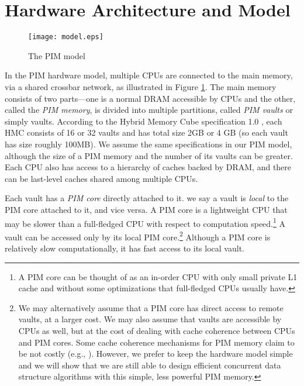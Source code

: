 \section{Hardware Architecture and Model}


\label{section:hardware_model}

\begin{figure}[ht!]
\centering
\texttt{[image: model.eps]}
\caption{The PIM model}
\label{figure:model}
\end{figure}

In the PIM hardware model, multiple CPUs are connected to the main
memory, via a shared crossbar network, as illustrated in Figure \ref{figure:model}.
The main memory consists of two parts---one is a normal DRAM accessible by CPUs 
and the other, called the \textit{PIM memory}, is divided into multiple partitions, 
called \textit{PIM vaults} or simply vaults.  
According to the Hybrid Memory Cube specification 1.0 \cite{website:HMC}, each HMC consists of 16 or 
32 vaults and has total size 2GB or 4 GB (so each vault has size roughly 100MB). 
We assume the same specifications in our PIM model, although the size of a PIM memory and 
the number of its vaults can be greater. 
Each CPU also has access to a hierarchy of caches backed by DRAM,
and there can be last-level caches shared among multiple CPUs. 

Each vault has a \textit{PIM core} directly attached to it.
we say a vault is \textit{local} to the PIM core attached to it, and vice versa.
A PIM core is a lightweight CPU that may be slower than a full-fledged CPU
with respect to computation speed.\footnote{
A PIM core can be thought of as an in-order CPU with only small private L1 cache and 
without some optimizations that full-fledged CPUs usually have.}
A vault can be accessed only by its local PIM core.\footnote{
We may alternatively assume that a PIM core has direct access to remote vaults, at a larger cost. 
We may also assume that vaults are accessible by CPUs as well, 
but at the cost of dealing with cache coherence between CPUs and PIM cores. 
Some cache coherence mechanisms for PIM memory claim to be not costly (e.g., \cite{boroumand2016}). 
However, we prefer to keep the hardware model simple and we will show that we are still able to 
design efficient concurrent data structure algorithms with this simple, less powerful PIM memory.}
Although a PIM core is relatively slow computationally, it has fast access to its local vault.

